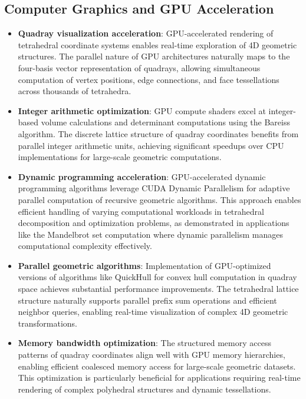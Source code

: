 \documentclass[
  10pt,
]{article}
\providecommand{\tightlist}{%
  \setlength{\itemsep}{0pt}\setlength{\parskip}{0pt}}
\begin{document}
\hypertarget{computer-graphics-and-gpu-acceleration}{%
\subsection{Computer Graphics and GPU
Acceleration}\label{computer-graphics-and-gpu-acceleration}}

\begin{itemize}
\tightlist
\item
  \textbf{Quadray visualization acceleration}: GPU-accelerated rendering
  of tetrahedral coordinate systems enables real-time exploration of 4D
  geometric structures. The parallel nature of GPU architectures
  naturally maps to the four-basis vector representation of quadrays,
  allowing simultaneous computation of vertex positions, edge
  connections, and face tessellations across thousands of tetrahedra.
\item
  \textbf{Integer arithmetic optimization}: GPU compute shaders excel at
  integer-based volume calculations and determinant computations using
  the Bareiss algorithm. The discrete lattice structure of quadray
  coordinates benefits from parallel integer arithmetic units, achieving
  significant speedups over CPU implementations for large-scale
  geometric computations.
\item
  \textbf{Dynamic programming acceleration}: GPU-accelerated dynamic
  programming algorithms leverage CUDA Dynamic Parallelism for adaptive
  parallel computation of recursive geometric algorithms. This approach
  enables efficient handling of varying computational workloads in
  tetrahedral decomposition and optimization problems, as demonstrated
  in applications like the Mandelbrot set computation where dynamic
  parallelism manages computational complexity effectively.
\item
  \textbf{Parallel geometric algorithms}: Implementation of
  GPU-optimized versions of algorithms like QuickHull for convex hull
  computation in quadray space achieves substantial performance
  improvements. The tetrahedral lattice structure naturally supports
  parallel prefix sum operations and efficient neighbor queries,
  enabling real-time visualization of complex 4D geometric
  transformations.
\item
  \textbf{Memory bandwidth optimization}: The structured memory access
  patterns of quadray coordinates align well with GPU memory
  hierarchies, enabling efficient coalesced memory access for
  large-scale geometric datasets. This optimization is particularly
  beneficial for applications requiring real-time rendering of complex
  polyhedral structures and dynamic tessellations.
\end{itemize}
\end{document}
